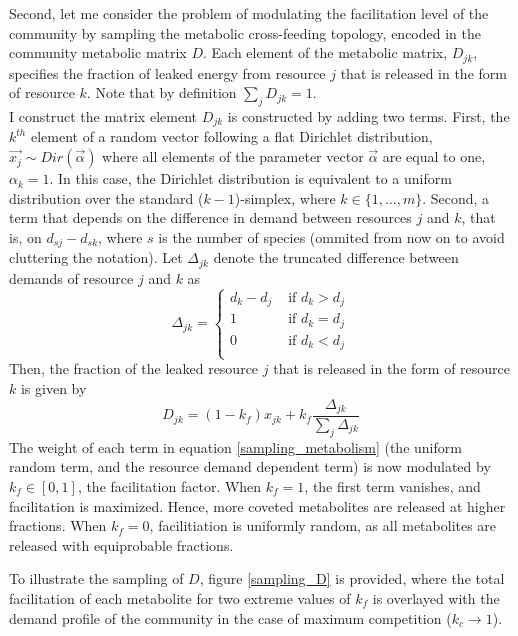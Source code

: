 \documentclass[12pt]{article}
\begin{document}
	Second, let me consider the problem of modulating the facilitation level of the community by sampling the metabolic cross-feeding topology, encoded in the community metabolic matrix $ D $. Each element of the metabolic matrix, $ D_{jk} $, specifies the fraction of leaked energy from resource $ j $ that is released in the form of resource $ k $. Note that by definition $ \sum_jD_{jk} = 1 $.\\ 
	I construct the matrix element $ D_{jk} $ is constructed by adding two terms. First, the $ k^{th} $ element of a random vector following a flat Dirichlet distribution, $ \vec{x_j} \sim Dir(\vec{\alpha})$ where all elements of the parameter vector $ \vec{\alpha} $ are equal to one, $ \alpha_k = 1 $. In this case, the Dirichlet distribution is equivalent to a uniform distribution over the standard ($ k  - 1 $)-simplex, where $ k \in \{1, \dots, m\} $. Second, a term that depends on the difference in demand between resources $ j $ and $ k $, that is, on $ d_{sj} - d_{sk}$, where $ s $ is the number of species (ommited from now on to avoid cluttering the notation). Let $ \Delta_{jk} $ denote the truncated difference between demands of resource $ j $ and $ k $ as
	\begin{equation}
		\Delta_{jk} = 
			\begin{cases}
				d_k - d_j & \text{ if } d_k > d_j\\
				1 & \text{ if } d_k = d_j\\
				0 & \text{ if } d_k < d_j\\
			\end{cases}
	\end{equation}
	Then, the fraction of the leaked resource $ j $ that is released in the form of resource $ k $ is given by
	\begin{equation}\label{sampling_metabolism}
		D_{jk} = (1-k_f)x_{jk} + k_f\frac{\Delta_{jk}}{\sum_j\Delta_{jk}}
	\end{equation}
	The weight of each term in equation \ref{sampling_metabolism} (the uniform random term, and the resource demand dependent term) is now modulated by $ k_f \in [0, 1]$, the facilitation factor. When $ k_f = 1 $, the first term  vanishes, and facilitation is maximized. Hence, more coveted metabolites are released at higher fractions. When $ k_f = 0 $, facilitiation is uniformly random, as all metabolites are released with equiprobable fractions.\par
	To illustrate the sampling of $ D $, figure \ref{sampling_D} is provided, where the total facilitation of each metabolite for two extreme values of $ k_f $ is overlayed with the demand profile of the community  in the case of maximum competition ($ k_c \rightarrow 1 $).\\
	
\end{document}
